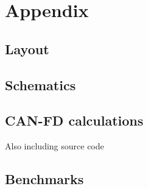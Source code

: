 \section*{Appendix}

\subsection*{Layout}

\subsection*{Schematics}

\subsection*{CAN-FD calculations}

{\color{red} Also including source code}

\subsection*{Benchmarks}
